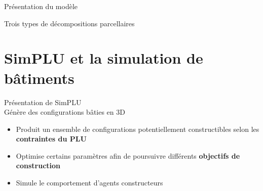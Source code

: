 \documentclass[xcolor=table]{beamer}
\begin{document}
\begin{frame}{Présentation du modèle}
\end{frame}

\begin{frame}{Trois types de décompositions parcellaires}
	
\end{frame}



\section[SimPLU]{SimPLU et la simulation de bâtiments}



\begin{frame}{Présentation de SimPLU}
	\\
	Génère des configurations bâties en 3D
	\begin{itemize}
		\item Produit un ensemble de configurations potentiellement constructibles selon les \textbf{contraintes du PLU}
		\item Optimise certains paramètres afin de poursuivre différents \textbf{objectifs de construction}
		\item Simule le comportement d'agents constructeurs
	\end{itemize} 
\end{frame}
\end{document}
